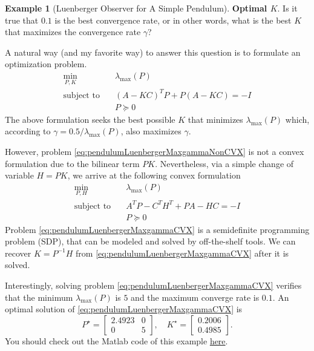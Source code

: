 \documentclass[
]{book}
\theoremstyle{definition}
\theoremstyle{definition}
\newtheorem{example}{Example}[chapter]
\theoremstyle{definition}
\theoremstyle{definition}
\theoremstyle{remark}
\begin{document}
\begin{example}[Luenberger Observer for A Simple Pendulum]
\textbf{Optimal \(K\)}. Is it true that \(0.1\) is the best convergence rate, or in other words, what is the best \(K\) that maximizes the convergence rate \(\gamma\)?

A natural way (and my favorite way) to answer this question is to formulate an optimization problem.
\begin{equation}
\begin{split}
\min_{P,K} & \quad \lambda_{\max}(P) \\
\text{subject to} & \quad (A - KC)^T P + P (A - KC) = -I \\
& \quad P \succeq 0
\end{split}
\label{eq:pendulumLuenbergerMaxgammaNonCVX}
\end{equation}
The above formulation seeks the best possible \(K\) that minimizes \(\lambda_{\max}(P)\) which, according to \(\gamma = 0.5 / \lambda_{\max}(P)\), also maximizes \(\gamma\).

However, problem \eqref{eq:pendulumLuenbergerMaxgammaNonCVX} is not a convex formulation due to the bilinear term \(PK\). Nevertheless, via a simple change of variable \(H = PK\), we arrive at the following convex formulation
\begin{equation}
\begin{split}
\min_{P,H} & \quad \lambda_{\max}(P) \\
\text{subject to} & \quad A^T P - C^T H^T + PA - H C = - I \\
& \quad P \succeq 0
\end{split}
\label{eq:pendulumLuenbergerMaxgammaCVX}
\end{equation}
Problem \eqref{eq:pendulumLuenbergerMaxgammaCVX} is a semidefinite programming problem (SDP), that can be modeled and solved by off-the-shelf tools. We can recover \(K = P^{-1} H\) from \eqref{eq:pendulumLuenbergerMaxgammaCVX} after it is solved.

Interestingly, solving problem \eqref{eq:pendulumLuenbergerMaxgammaCVX} verifies that the minimum \(\lambda_{\max}(P)\) is \(5\) and the maximum converge rate is \(0.1\). An optimal solution of \eqref{eq:pendulumLuenbergerMaxgammaCVX} is
\[
P^\star = \begin{bmatrix}
2.4923 & 0 \\ 0 & 5 \end{bmatrix}, \quad 
K^\star = \begin{bmatrix}
0.2006 \\ 0.4985 \end{bmatrix}.
\]
You should check out the Matlab code of this example \href{https://github.com/ComputationalRobotics/OptimalControlEstimation-Examples/blob/main/pendulum_luenberger.m}{here}.
\end{example}
\end{document}
